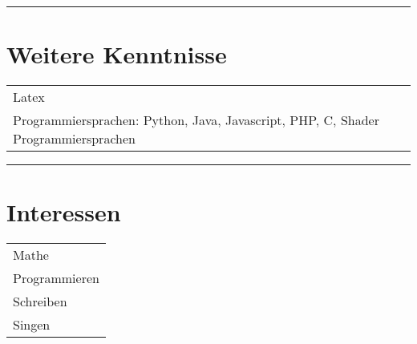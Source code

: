 \documentclass{article}
\newcommand{\sep}{\vspace{2em}\rule{\linewidth}{1pt}}
\begin{document}
	\sep
	
	\section*{\sffamily Weitere Kenntnisse}
	\begin{tabular}{l}
		Latex \\
		Programmiersprachen: Python, Java, Javascript, PHP, C, Shader Programmiersprachen \\
	\end{tabular}
	
	\sep
	
	\section*{\sffamily Interessen}
	\begin{tabular}{l}
		Mathe \\
		Programmieren \\
		Schreiben \\
		Singen \\
	\end{tabular}
\end{document}
